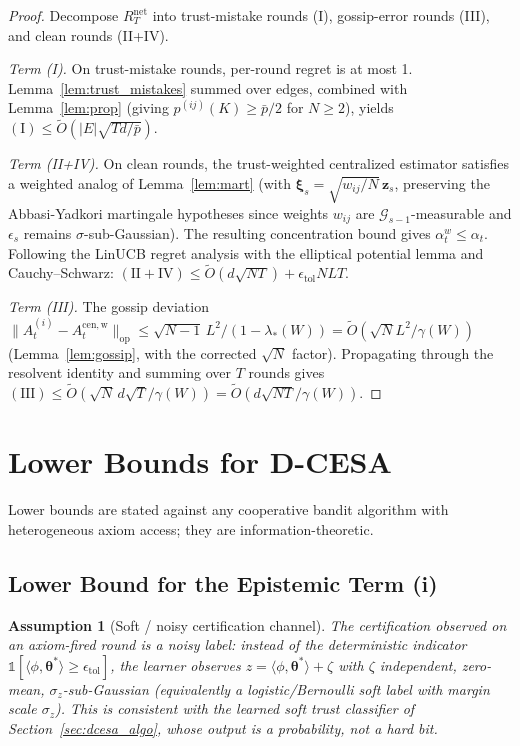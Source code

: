 \documentclass[11pt]{article}
\newtheorem{assumption}[theorem]{Assumption}
\begin{document}
\begin{proof}
Decompose $R_T^{\mathrm{net}}$ into trust-mistake rounds (I),
gossip-error rounds (III), and clean rounds (II+IV).

\textit{Term (I).}
On trust-mistake rounds, per-round regret is at most 1.
Lemma~\ref{lem:trust_mistakes} summed over edges, combined with
Lemma~\ref{lem:prop} (giving $p^{(ij)}(K)\geq\bar{p}/2$ for $N\geq 2$),
yields $(\mathrm{I})\leq\widetilde{O}(|E|\sqrt{Td/\bar{p}})$.

\textit{Term (II+IV).}
On clean rounds, the trust-weighted centralized estimator satisfies
a weighted analog of Lemma~\ref{lem:mart} (with
$\bm{\xi}_s=\sqrt{w_{ij}/N}\,\bm{z}_s$, preserving the
Abbasi-Yadkori martingale hypotheses since weights $w_{ij}$ are
$\mathcal{G}_{s-1}$-measurable and $\epsilon_s$ remains
$\sigma$-sub-Gaussian).  The resulting concentration bound gives
$\alpha_t^w\leq\alpha_t$.  Following the LinUCB regret analysis with
the elliptical potential lemma and Cauchy--Schwarz:
$(\mathrm{II+IV})\leq\widetilde{O}(d\sqrt{NT})+\epsilon_{\mathrm{tol}}NLT$.

\textit{Term (III).}
The gossip deviation
$\|A_t^{(i)}-A_t^{\mathrm{cen,w}}\|_{\mathrm{op}}\leq\sqrt{N-1}\,L^2/(1-\lambda_*(W))
=\widetilde{O}(\sqrt N L^2/\gamma(W))$
(Lemma~\ref{lem:gossip}, with the corrected $\sqrt N$ factor).
Propagating through the resolvent identity and summing over $T$ rounds
gives $(\mathrm{III})\leq\widetilde{O}(\sqrt N\,d\sqrt{T}/\gamma(W))
=\widetilde{O}(d\sqrt{NT}/\gamma(W))$.
\end{proof}


\section{Lower Bounds for D-CESA}\label{sec:dcesa_lower}

Lower bounds are stated against any cooperative bandit algorithm
with heterogeneous axiom access; they are information-theoretic.

\subsection{Lower Bound for the Epistemic Term (i)}

\begin{assumption}[Soft / noisy certification channel]\label{ass:softcert}
The certification observed on an axiom-fired round is a \emph{noisy}
label: instead of the deterministic indicator
$\mathbb{1}[\langle\phi,\bm{\theta}^{\!*}\rangle\geq\epsilon_{\mathrm{tol}}]$,
the learner observes $z=\langle\phi,\bm{\theta}^{\!*}\rangle+\zeta$ with
$\zeta$ independent, zero-mean, $\sigma_z$-sub-Gaussian (equivalently a
logistic/Bernoulli soft label with margin scale $\sigma_z$).  This is
consistent with the \emph{learned} soft trust classifier of
Section~\ref{sec:dcesa_algo}, whose output is a probability, not a hard
bit.
\end{assumption}
\end{document}

